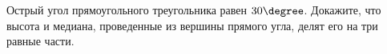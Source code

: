 \begin{ex}
	\begin{condition}
		Острый угол прямоугольного треугольника равен \( 30\degree \). Докажите, что высота и медиана, проведенные из вершины прямого угла, делят его на три равные части.
	\end{condition}
\end{ex}